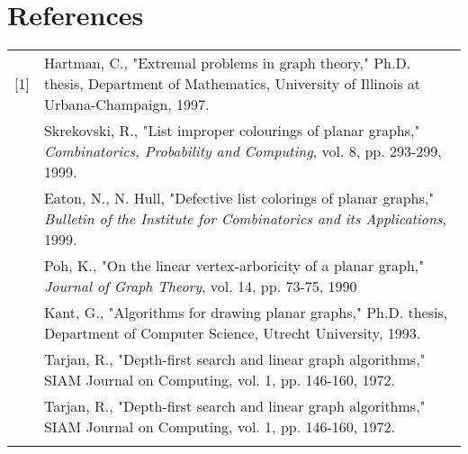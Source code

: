 \documentclass[11pt,letter]{article}
\begin{document}
\begin{comment}
\begin{algorithm}
\LinesNumbered
\DontPrintSemicolon
\KwIn{Plane graph $G$ and paths $P=p_0\ldots p_n$ and $Q=q_0\ldots q_m$}
\Begin{
	\Repeat{$t_0\not\in P\cup Q$} {
		$t_0\longleftarrow$ vertex forming face with $p_0$ and $q_0$\;
		\If{$t_0 = p_1$} {
			$P\longleftarrow P - p_0$\;
		}
		\ElseIf{$t_0 = q_1$} {
			$Q\longleftarrow Q - q_0$\; 
		}
	}
	\Repeat{$t_1\not\in P\cup Q$} {
		$t_1\longleftarrow$ vertex forming face with $p_n$ and $q_m$\;
		\If{$t_1 = p_{n-1}$} {
			$P\longleftarrow P - p_n$\;
		}
		\ElseIf{$t_1 = q_{m-1}$} {
			$Q\longleftarrow Q - q_m$\; 
		}
	}
	perform BFS starting at $t_1$\;
	\If{BFS finds $t_0$} {
		$T\longleftarrow$ BFS path $t_0$ to $t_1$\;
	}
	\Else {
		we hit an vertex $u$ with neighbors $p_i\in P$ and $q_j\in Q$\;
		$T\longleftarrow$ BFS path $u$ to $t_1$\;
		recurse on subgraph bounded by $p_0\ldots p_i$ and $q_0\ldots q_j$\;
		$P\longleftarrow p_i\ldots p_n$\;
		$Q\longleftarrow q_j\ldots q_m$\;
	}
	recurse on subgraph bounded by $P$ and $T$\;
	recurse on subgraph bounded by $T$ and $Q$\;
}
\caption{Path 3-Color}
\end{algorithm}
\end{comment}

\section*{References}

\begin{tabularx}{\linewidth}{lX}
[1] & Hartman, C., "Extremal problems in graph theory," Ph.D. thesis, Department of Mathematics,
University of Illinois at Urbana-Champaign, 1997.\\\relax
[2] & Skrekovski, R., "List improper colourings of planar graphs,"
\emph{Combinatorics, Probability and Computing}, vol. 8, pp. 293-299, 1999.\\\relax
[3] & Eaton, N., N. Hull, "Defective list colorings of planar graphs,"
\emph{Bulletin of the Institute for Combinatorics and its Applications}, 1999.\\\relax
[4] & Poh, K., "On the linear vertex-arboricity of a planar graph," \emph{Journal of Graph Theory},
vol. 14, pp. 73-75, 1990\\\relax
[5] & Kant, G., "Algorithms for drawing planar graphs," Ph.D. thesis, Department of Computer Science,
Utrecht University, 1993.\\\relax
[6] & Tarjan, R., "Depth-first search and linear graph algorithms," SIAM Journal on Computing, vol. 1, pp.
146-160, 1972.\\\relax
[6] & Tarjan, R., "Depth-first search and linear graph algorithms," SIAM Journal on Computing, vol. 1, pp.
146-160, 1972.\\\relax
\end{tabularx}
\end{document}
